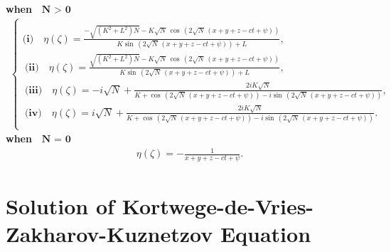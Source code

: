 \documentclass{article}
\numberwithin{equation}{section}
\begin{document}
\textbf{when $\textbf{ N $>$ 0} $ }
\noindent
\begin{align}\label{FAM2}
\begin{cases}\\
\textbf{(i)}\quad \eta \! \left(\zeta \right) =\frac{-\sqrt{\left(K^{2}+L^{2}\right) N}-K \sqrt{N}\, \cos \, \left(2 \sqrt{N}\, \left(x+y+z-ct +\psi \right)\right)}{K \sin \, \left(2 \sqrt{N}\, \left(x+y+z-ct +\psi \right)\right)+L},\\\
\textbf{(ii)}\quad \eta \! \left(\zeta \right) =\frac{\sqrt{\left(K^{2}+L^{2}\right) N}-K \sqrt{N}\, \cos \, \left(2 \sqrt{N}\, \left(x+y+z-ct +\psi \right)\right)}{K \sin \, \left(2 \sqrt{N}\, \left(x+y+z-ct +\psi \right)\right)+L},\\\
\textbf{(iii)}\quad \eta \! \left(\zeta \right) =-i \sqrt{N}+\frac{2 i K \sqrt{N}}{K +\cos \, \left(2 \sqrt{N}\, \left(x+y+z-ct +\psi \right)\right)-i \sin \, \left(2 \sqrt{N}\, \left(x+y+z-ct +\psi \right)\right)},\\\
\textbf{(iv)}\quad \eta \! \left(\zeta \right) =i \sqrt{N}+\frac{2 i K \sqrt{N}}{K +\cos \, \left(2 \sqrt{N}\, \left(x+y+z-ct +\psi \right)\right)-i \sin \, \left(2 \sqrt{N}\, \left(x+y+z-ct +\psi \right)\right)}.\\\
\end{cases}
\end{align}
\textbf{when $\textbf{ N $=$ 0}$ }
\begin{eqnarray}\label{FAM3}
\quad \eta \! \left(\zeta \right) = -\frac{1}{x+y+z-ct +\psi}.
\end{eqnarray}
\section{Solution of Kortwege-de-Vries-Zakharov-Kuznetzov Equation}
\end{document}
